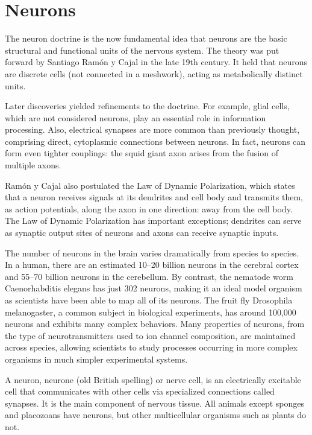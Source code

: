 \hypertarget{neurons}{%
\section{Neurons}\label{neurons}}

The neuron doctrine is the now fundamental idea that neurons are the basic structural and functional units of the nervous system. The theory was put forward by Santiago Ramón y Cajal in the late 19th century. It held that neurons are discrete cells (not connected in a meshwork), acting as metabolically distinct units.

Later discoveries yielded refinements to the doctrine. For example, glial cells, which are not considered neurons, play an essential role in information processing. Also, electrical synapses are more common than previously thought, comprising direct, cytoplasmic connections between neurons. In fact, neurons can form even tighter couplings: the squid giant axon arises from the fusion of multiple axons.

Ramón y Cajal also postulated the Law of Dynamic Polarization, which states that a neuron receives signals at its dendrites and cell body and transmits them, as action potentials, along the axon in one direction: away from the cell body. The Law of Dynamic Polarization has important exceptions; dendrites can serve as synaptic output sites of neurons and axons can receive synaptic inputs.

The number of neurons in the brain varies dramatically from species to species. In a human, there are an estimated 10--20 billion neurons in the cerebral cortex and 55--70 billion neurons in the cerebellum. By contrast, the nematode worm Caenorhabditis elegans has just 302 neurons, making it an ideal model organism as scientists have been able to map all of its neurons. The fruit fly Drosophila melanogaster, a common subject in biological experiments, has around 100,000 neurons and exhibits many complex behaviors. Many properties of neurons, from the type of neurotransmitters used to ion channel composition, are maintained across species, allowing scientists to study processes occurring in more complex organisms in much simpler experimental systems.

A neuron, neurone (old British spelling) or nerve cell, is an electrically excitable cell that communicates with other cells via specialized connections called synapses. It is the main component of nervous tissue. All animals except sponges and placozoans have neurons, but other multicellular organisms such as plants do not.

